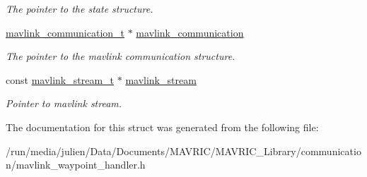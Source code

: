 \begin{DoxyCompactItemize}
\begin{DoxyCompactList}\small\item\em The pointer to the state structure. \end{DoxyCompactList}\item 
\hypertarget{structmavlink__waypoint__handler__t_a44604118c3958a67d4f2406c754120ec}{\hyperlink{structmavlink__communication__t}{mavlink\+\_\+communication\+\_\+t} $\ast$ \hyperlink{structmavlink__waypoint__handler__t_a44604118c3958a67d4f2406c754120ec}{mavlink\+\_\+communication}}\label{structmavlink__waypoint__handler__t_a44604118c3958a67d4f2406c754120ec}

\begin{DoxyCompactList}\small\item\em The pointer to the mavlink communication structure. \end{DoxyCompactList}\item 
\hypertarget{structmavlink__waypoint__handler__t_afb339819f643e8f191fbd8a604b191d4}{const \hyperlink{structmavlink__stream__t}{mavlink\+\_\+stream\+\_\+t} $\ast$ \hyperlink{structmavlink__waypoint__handler__t_afb339819f643e8f191fbd8a604b191d4}{mavlink\+\_\+stream}}\label{structmavlink__waypoint__handler__t_afb339819f643e8f191fbd8a604b191d4}

\begin{DoxyCompactList}\small\item\em Pointer to mavlink stream. \end{DoxyCompactList}\end{DoxyCompactItemize}


The documentation for this struct was generated from the following file\+:\begin{DoxyCompactItemize}
\item 
/run/media/julien/\+Data/\+Documents/\+M\+A\+V\+R\+I\+C/\+M\+A\+V\+R\+I\+C\+\_\+\+Library/communication/mavlink\+\_\+waypoint\+\_\+handler.\+h\end{DoxyCompactItemize}
